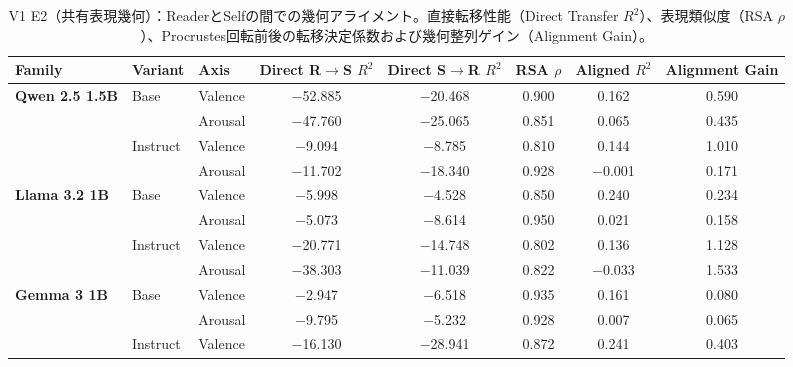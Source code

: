\begin{table}[htbp]
\centering
\small
\caption{V1 E2（共有表現幾何）：ReaderとSelfの間での幾何アライメント。直接転移性能（Direct Transfer $R^2$）、表現類似度（RSA $\rho$）、Procrustes回転前後の転移決定係数および幾何整列ゲイン（Alignment Gain）。}
\label{tab:v1_shared_geometry}
\begin{tabular}{lll cccc c}
\toprule
\textbf{Family} & \textbf{Variant} & \textbf{Axis} & \textbf{Direct R$\to$S $R^2$} & \textbf{Direct S$\to$R $R^2$} & \textbf{RSA $\rho$} & \textbf{Aligned $R^2$} & \textbf{Alignment Gain} \\
\midrule
\multirow{4}{*}{\textbf{Qwen 2.5 1.5B}} & \multirow{2}{*}{Base} & Valence  & $-$52.885    & $-$20.468    & 0.900      & 0.162      & 0.590      \\
                                 &                    & Arousal  & $-$47.760    & $-$25.065    & 0.851      & 0.065      & 0.435      \\
\cmidrule(lr){2-8}
                                 & \multirow{2}{*}{Instruct} & Valence  & $-$9.094     & $-$8.785     & 0.810      & 0.144      & 1.010      \\
                                 &                    & Arousal  & $-$11.702    & $-$18.340    & 0.928      & $-$0.001   & 0.171      \\
\midrule
\multirow{4}{*}{\textbf{Llama 3.2 1B}} & \multirow{2}{*}{Base} & Valence  & $-$5.998     & $-$4.528     & 0.850      & 0.240      & 0.234      \\
                                 &                    & Arousal  & $-$5.073     & $-$8.614     & 0.950      & 0.021      & 0.158      \\
\cmidrule(lr){2-8}
                                 & \multirow{2}{*}{Instruct} & Valence  & $-$20.771    & $-$14.748    & 0.802      & 0.136      & 1.128      \\
                                 &                    & Arousal  & $-$38.303    & $-$11.039    & 0.822      & $-$0.033   & 1.533      \\
\midrule
\multirow{4}{*}{\textbf{Gemma 3 1B}} & \multirow{2}{*}{Base} & Valence  & $-$2.947     & $-$6.518     & 0.935      & 0.161      & 0.080      \\
                                 &                    & Arousal  & $-$9.795     & $-$5.232     & 0.928      & 0.007      & 0.065      \\
\cmidrule(lr){2-8}
                                 & \multirow{2}{*}{Instruct} & Valence  & $-$16.130    & $-$28.941    & 0.872      & 0.241      & 0.403      \\

\end{tabular}
\end{table}
